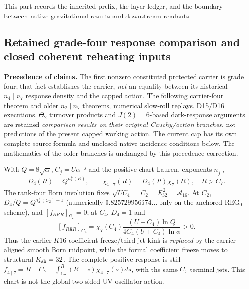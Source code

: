 \documentclass[12pt,a4paper]{article}
\begin{document}
\label{p8:part:framework-prefix-status}

This part records the inherited prefix, the layer ledger, and the boundary between native gravitational results and downstream readouts.


\subsection{Retained grade-four response comparison and closed coherent reheating inputs}
\label{p8:sec:v2219-current-branch}
\noindent\textbf{Precedence of claims.}
The first nonzero constituted protected carrier is grade four;
that fact establishes the carrier, \emph{not} an equality between its
historical $n_4\mid n_7$ response density and the capped action.
The following carrier-four theorem and older $n_2\mid n_7$ theorems,
numerical slow-roll replays, D15/D16 executions, $\Theta_2$
turnover products and $J(2)=6$-based dark-response arguments are
retained \emph{comparison results on their original Cauchy/action
branches}, not predictions of the present capped working action.
The current cap has its own complete-source formula and unclosed native
incidence conditions below. The mathematics of the older branches is
unchanged by this precedence correction.
\begin{theorem}
\label{p8:thm:v2219-active-dressing}
With $Q=8\sqrt\alpha$, $C_j=U\alpha^{-j}$ and the positive-chart
Laurent exponents $n_j^+$,
\[
 \boxed{D_4(R)=Q^{n_4^+(R)},\qquad
 \chi_{4\mid7}(R)=D_4(R)\chi_7(R),\quad R>C_7.}
\]
The rank-four Born involution fixes
$\sqrt{UC_4}=C_2=E_{32}^{\,2}=\mathcal A_{16}$.
At $C_2$, $D_4/Q=Q^{n_4^+(C_2)-1}$ (numerically
$0.825729956674\ldots$ only on the anchored $\mathrm{REG}_0$
scheme), and $[f_{RRR}]_{C_2}=0$; at $C_4$, $D_4=1$ and
\[
 \boxed{[f_{RRR}]_{C_4}=
 \chi_7(C_4)\frac{(U-C_4)\ln Q}{4C_4(U+C_4)\ln\alpha}>0.}
\]
Thus the earlier $K16$ coefficient freeze/third-jet kink is
\emph{replaced} by the carrier-aligned smooth Born midpoint, while the
formal coefficient freeze moves to structural $K_{\rm sh}=32$.
The complete positive response is still
$f_{4\mid7}^+=R-C_7+\int_{C_7}^R(R-s)\chi_{4\mid7}(s)ds$,
with the same $C_7$ terminal jets.  This chart is not the global
two-sided UV oscillator action.
\end{theorem}
\end{document}
